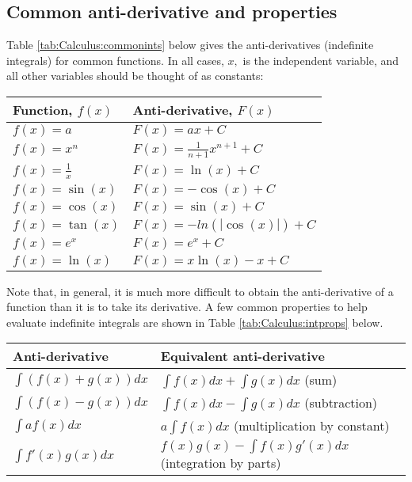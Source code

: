 \subsection{Common anti-derivative and properties}
Table \ref{tab:Calculus:commonints} below gives the anti-derivatives (indefinite integrals) for common functions. In all cases, $x,$ is the independent variable, and all other variables should be thought of as constants:
\begin{center}
\begin{tabular}{l l}
\textbf{Function, $f(x)$} & \textbf{Anti-derivative, $F(x)$}\\
\hline\hline
$f(x)=a$ & $F(x)=ax+C$ \\
$f(x)=x^n$ & $F(x)=\frac{1}{n+1}x^{n+1}+C$ \\
$f(x)=\frac{1}{x}$ & $F(x)=\ln(x)+C$ \\
$f(x)=\sin(x)$ & $F(x)=-\cos(x)+C$ \\
$f(x)=\cos(x)$ & $F(x)=\sin(x)+C$ \\
$f(x)=\tan(x)$ & $F(x)=-ln(|\cos(x)|)+C$ \\
$f(x)=e^x$ & $F(x)=e^x+C$ \\
$f(x)=\ln(x)$ & $F(x)=x\ln(x)-x+C$ \\
\hline
\end{tabular}
\end{center}

Note that, in general, it is much more difficult to obtain the anti-derivative of a function than it is to take its derivative. A few common properties to help evaluate indefinite integrals are shown in Table \ref{tab:Calculus:intprops} below.
\begin{center}
\begin{tabular}{l l}
\textbf{Anti-derivative} & \textbf{Equivalent anti-derivative}\\
\hline\hline
$\int (f(x)+g(x)) dx$ &$\int f(x)dx+\int g(x) dx$ (sum)\\
$\int (f(x)-g(x)) dx$ &$\int f(x)dx-\int g(x) dx$ (subtraction)\\
$\int af(x) dx$ & $a\int f(x)dx$ (multiplication by constant)\\
$\int f'(x)g(x) dx$ & $f(x)g(x)-\int f(x)g'(x) dx$ (integration by parts)\\
\hline
\end{tabular}
\end{center}


